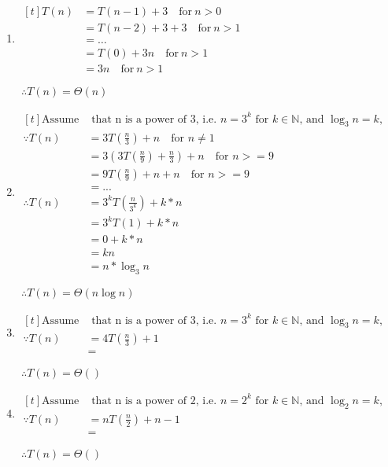 \documentclass{article}
\begin{document}
\begin{enumerate}[label=(\alph*)]
\item $\begin{aligned}[t]
T(n) &= T(n - 1) + 3 \quad \text{for}\ n > 0\\
&= T(n - 2) + 3 + 3 \quad \text{for}\ n > 1\\
&= \dots \\
&= T(0) + 3n \quad \text{for}\ n > 1\\
&= 3n \quad \text{for}\ n > 1
\end{aligned}$

$\ \therefore T(n) = \Theta(n)$

\item $\begin{aligned}[t]
\text{Assume} & \text{ that n is a power of 3, i.e. $n=3^k$ for $k \in \mathbb{N}$, and $\log_3 n = k$,}\\
\because T(n) &= 3T(\frac{n}{3}) + n \quad \text{for $n\neq1$}\\
&= 3(3T(\frac{n}{9}) + \frac{n}{3}) + n \quad \text{for $n>=9$}\\
&= 9T(\frac{n}{9}) + n + n \quad \text{for $n>=9$}\\
&= ...&\\
\therefore T(n) &= 3^kT(\frac{n}{3^k}) + k*n \\
&= 3^kT(1) + k*n\\
&= 0 + k*n\\
&= kn\\
&= n * \log_3 n
\end{aligned}$

$\ \therefore T(n) = \Theta(n \log n)$

\item $\begin{aligned}[t]
\text{Assume} & \text{ that n is a power of 3, i.e. $n=3^k$ for $k \in \mathbb{N}$, and $\log_3 n = k$,}\\
\because T(n) &= 4T(\frac{n}{3})+1 \\
&=
\end{aligned}$

$\ \therefore T(n) = \Theta()$

\item $\begin{aligned}[t]
\text{Assume} & \text{ that n is a power of 2, i.e. $n=2^k$ for $k \in \mathbb{N}$, and $\log_2 n = k$,}\\
\because T(n) &= nT(\frac{n}{2})+n-1\\
&=
\end{aligned}$

$\ \therefore T(n) = \Theta()$

\end{enumerate}
\end{document}
